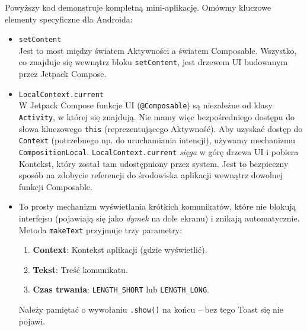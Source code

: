 Powyższy kod demonstruje kompletną mini-aplikację. Omówmy kluczowe elementy specyficzne dla Androida:

\begin{itemize}
    \item \texttt{setContent} \\
    Jest to most między światem Aktywności a światem Composable. Wszystko, co znajduje się wewnątrz bloku \texttt{setContent}, jest drzewem UI budowanym przez Jetpack Compose.


    \item \texttt{LocalContext.current} \\
    W Jetpack Compose funkcje UI (\texttt{@Composable}) są niezależne od klasy \texttt{Activity}, w której się znajdują. Nie mamy więc bezpośredniego dostępu do słowa kluczowego \texttt{this} (reprezentującego Aktywność).
    Aby uzyskać dostęp do \texttt{Context} (potrzebnego np. do uruchamiania intencji), używamy mechanizmu \texttt{CompositionLocal}. \texttt{LocalContext.current} \textit{sięga} w górę drzewa UI i pobiera Kontekst, który został tam udostępniony przez system. Jest to bezpieczny sposób na zdobycie referencji do środowiska aplikacji wewnątrz dowolnej funkcji Composable.

    \item[\texttt{Toast}] 
    To prosty mechanizm wyświetlania krótkich komunikatów, które nie blokują interfejsu (pojawiają się jako \textit{dymek} na dole ekranu) i znikają automatycznie.
    Metoda \texttt{makeText} przyjmuje trzy parametry:
    \begin{enumerate}
        \item \textbf{Context}: Kontekst aplikacji (gdzie wyświetlić).
        \item \textbf{Tekst}: Treść komunikatu.
        \item \textbf{Czas trwania}: \texttt{LENGTH\_SHORT} lub \texttt{LENGTH\_LONG}.
    \end{enumerate}
    Należy pamiętać o wywołaniu \texttt{.show()} na końcu – bez tego Toast się nie pojawi.
\end{itemize}

